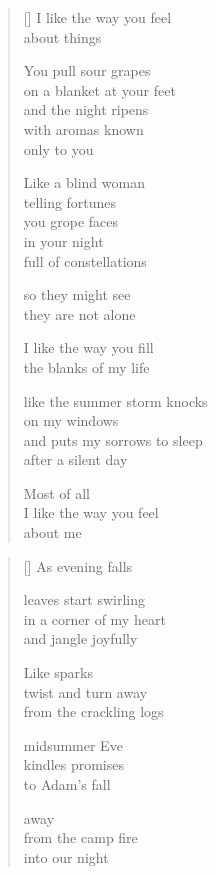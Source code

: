 \documentclass[12pt,a4paper]{article}
\begin{document}
\begin{verse}[\versewidth]
  I like the way you feel \\
  about things

  You pull sour grapes \\
  on a blanket at your feet \\
  and the night ripens \\
  with aromas known \\
  only to you

  Like a blind woman \\
  telling fortunes \\
  you grope faces \\
  in your night \\
  full of constellations

  so they might see \\
  they are not alone

  I like the way you fill \\
  the blanks of my life

  like the summer storm knocks \\
  on my windows \\
  and puts my sorrows to sleep \\
  after a silent day

  Most of all \\
  I like the way you feel \\
  about me
\end{verse}


\newpage

\poemtitle{}

\settowidth{\versewidth}{in a corner of my heart}

\bigskip

\begin{verse}[\versewidth]
  As evening falls

  leaves start swirling \\
  in a corner of my heart \\
  and jangle joyfully

  Like sparks \\
  twist and turn away \\
  from the crackling logs

  midsummer Eve \\
  kindles promises \\
  to Adam's fall

  away \\
  from the camp fire \\
  into our night
\end{verse}
\end{document}

